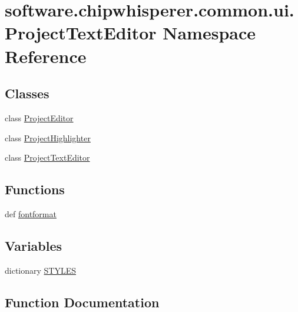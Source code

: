 \hypertarget{namespacesoftware_1_1chipwhisperer_1_1common_1_1ui_1_1ProjectTextEditor}{}\section{software.\+chipwhisperer.\+common.\+ui.\+Project\+Text\+Editor Namespace Reference}
\label{namespacesoftware_1_1chipwhisperer_1_1common_1_1ui_1_1ProjectTextEditor}
\subsection*{Classes}
\begin{DoxyCompactItemize}
\item 
class \hyperlink{classsoftware_1_1chipwhisperer_1_1common_1_1ui_1_1ProjectTextEditor_1_1ProjectEditor}{Project\+Editor}
\item 
class \hyperlink{classsoftware_1_1chipwhisperer_1_1common_1_1ui_1_1ProjectTextEditor_1_1ProjectHighlighter}{Project\+Highlighter}
\item 
class \hyperlink{classsoftware_1_1chipwhisperer_1_1common_1_1ui_1_1ProjectTextEditor_1_1ProjectTextEditor}{Project\+Text\+Editor}
\end{DoxyCompactItemize}
\subsection*{Functions}
\begin{DoxyCompactItemize}
\item 
def \hyperlink{namespacesoftware_1_1chipwhisperer_1_1common_1_1ui_1_1ProjectTextEditor_a4509958a6872ff0910dce94fc604722a}{fontformat}
\end{DoxyCompactItemize}
\subsection*{Variables}
\begin{DoxyCompactItemize}
\item 
dictionary \hyperlink{namespacesoftware_1_1chipwhisperer_1_1common_1_1ui_1_1ProjectTextEditor_ab8f16bee0288aa31c33096fe8fb4c618}{S\+T\+Y\+L\+E\+S}
\end{DoxyCompactItemize}


\subsection{Function Documentation}
\hypertarget{namespacesoftware_1_1chipwhisperer_1_1common_1_1ui_1_1ProjectTextEditor_a4509958a6872ff0910dce94fc604722a}{}
